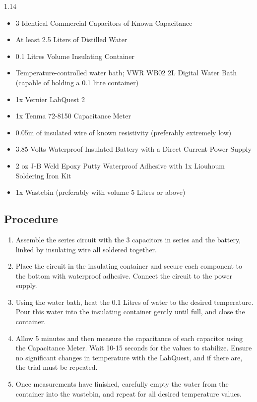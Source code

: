 \documentclass[12pt]{article}
\numberwithin{equation}{section}
\begin{document}
\begin{spacing}{1.14}

\begin{itemize}
    \item 3 Identical Commercial Capacitors of Known Capacitance
    \item At least 2.5 Liters of Distilled Water
    \item 0.1 Litres Volume Insulating Container
    \item Temperature-controlled water bath; VWR WB02 2L Digital Water Bath (capable of holding a 0.1 litre container)
    \item 1x Vernier LabQuest 2
    \item 1x Tenma 72-8150 Capacitance Meter
    \item 0.05m of insulated wire of known resistivity (preferably extremely low)
    \item 3.85 Volts Waterproof Insulated Battery with a Direct Current Power Supply
    \item 2 oz J-B Weld Epoxy Putty Waterproof Adhesive with 1x Liouhoum Soldering Iron Kit
    \item 1x Wastebin (preferably with volume 5 Litres or above)
\end{itemize}

\subsection{Procedure}
\begin{enumerate}
    \item Assemble the series circuit with the 3 capacitors in series and the battery, linked by insulating wire all soldered together.
    \item Place the circuit in the insulating container and secure each component to the bottom with waterproof adhesive. Connect the circuit to the power supply.
    \item Using the water bath, heat the 0.1 Litres of water to the desired temperature. Pour this water into the insulating container gently until full, and close the container.
    \item Allow 5 minutes and then measure the capacitance of each capacitor using the Capacitance Meter. Wait 10-15 seconds for the values to stabilize. Ensure no significant changes in temperature with the LabQuest, and if there are, the trial must be repeated.
    \item Once measurements have finished, carefully empty the water from the container into the wastebin, and repeat for all desired temperature values.
\end{enumerate}
\end{spacing}
\end{document}
